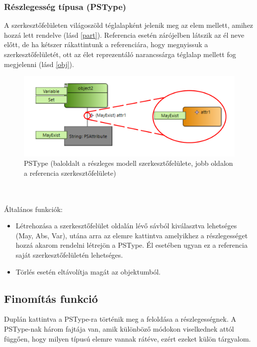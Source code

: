 \subsubsection{Részlegesség típusa (PSType)}
A szerkesztőfelületen világoszöld téglalapként jelenik meg az elem mellett, amihez hozzá lett rendelve (lásd \autoref{part}). Referencia esetén zárójelben látszik az él neve előtt, de ha kétszer rákattintunk a referenciára, hogy megnyissuk a szerkesztőfelületét, ott az élet reprezentáló narancssárga téglalap mellett fog megjelenni (lásd \autoref{obj}).
\begin{figure}[!ht]
	\centering
	\includegraphics[scale = 0.3]{figures/part.pdf}
	\caption{PSType (baloldalt a részleges modell szerkesztőfelülete, jobb oldalon a referencia szerkesztőfelülete)}
	\label{part} 
\end{figure}
\\\\
Általános funkciók:
\begin{itemize}  	
	\item Létrehozása a szerkesztőfelület oldalán lévő sávból kiválasztva lehetséges (May, Abs, Var), utána arra az elemre kattintva amelyikhez a részlegességet hozzá akarom rendelni létrejön a PSType. Él esetében ugyan ez a referencia saját szerkesztőfelületén lehetséges.
	
	\item Törlés esetén eltávolítja magát az objektumból.
\end{itemize}

\subsection{Finomítás funkció}
Duplán kattintva a PSType-ra történik meg a feloldása a részlegességnek. A PSType-nak három fajtája van, amik különböző módokon viselkednek attól függően, hogy milyen típusú elemre vannak rátéve, ezért ezeket külön tárgyalom. 

